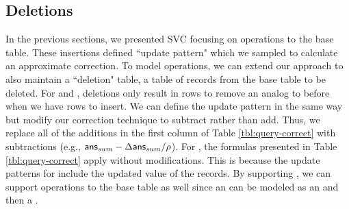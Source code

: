 

\subsection{Deletions}\label{sec:del}
In the previous sections, we presented SVC focusing on \insertion operations to the base table.
These insertions defined ``update pattern" which we sampled to calculate an approximate correction.
To model \delete operations, we can extend our approach to also maintain a ``deletion" table, a table of records from the base table to be deleted. 
For \fjview and \spview, deletions only result in rows to remove an analog to before when we have rows to insert.
We can define the update pattern in the same way but modify our correction technique to subtract rather than add.
Thus, we replace all of the additions in the first column of Table \ref{tbl:query-correct} with subtractions  (e.g., $\textsf{ans}_{sum}-\Delta\textsf{ans}_{sum}/\rho $).
For \aggview, the formulas presented in Table \ref{tbl:query-correct} apply without modifications.
This is because the update patterns for \aggview include the updated value of the records.
By supporting \delete, we can support \update operations to the base table as well since an \update can be modeled as an \insertion and then a \delete.
